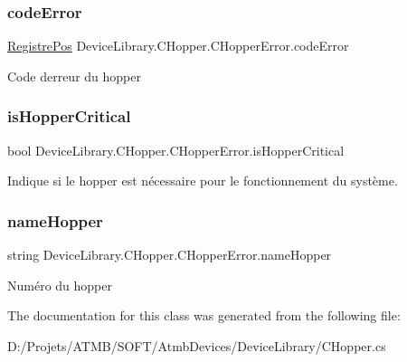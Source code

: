 \subsubsection{\texorpdfstring{code\+Error}{codeError}}
{\footnotesize\ttfamily \mbox{\hyperlink{class_device_library_1_1_c_hopper_afce8f2089a688f1d3fdf9db91242fb01}{Registre\+Pos}} Device\+Library.\+C\+Hopper.\+C\+Hopper\+Error.\+code\+Error}



Code d\textquotesingle{}erreur du hopper 

\mbox{\label{class_device_library_1_1_c_hopper_1_1_c_hopper_error_a3807ac7aa4c86af85a302c53d4c515de}} 
\subsubsection{\texorpdfstring{is\+Hopper\+Critical}{isHopperCritical}}
{\footnotesize\ttfamily bool Device\+Library.\+C\+Hopper.\+C\+Hopper\+Error.\+is\+Hopper\+Critical}



Indique si le hopper est nécessaire pour le fonctionnement du système. 

\mbox{\label{class_device_library_1_1_c_hopper_1_1_c_hopper_error_a0b9f9b66126ab5bb7d8fab1cb6a74370}} 
\subsubsection{\texorpdfstring{name\+Hopper}{nameHopper}}
{\footnotesize\ttfamily string Device\+Library.\+C\+Hopper.\+C\+Hopper\+Error.\+name\+Hopper}



Numéro du hopper 



The documentation for this class was generated from the following file\+:\begin{DoxyCompactItemize}
\item 
D\+:/\+Projets/\+A\+T\+M\+B/\+S\+O\+F\+T/\+Atmb\+Devices/\+Device\+Library/C\+Hopper.\+cs\end{DoxyCompactItemize}
